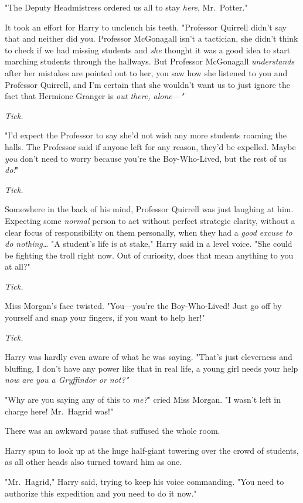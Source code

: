 "The Deputy Headmistress ordered us all to stay \emph{here}, Mr.~Potter."

It took an effort for Harry to unclench his teeth. "Professor Quirrell didn't 
say that and neither did you. Professor McGonagall isn't a tactician, she 
didn't think to check if we had missing students and \emph{she} thought it was 
a good idea to start marching students through the hallways. But Professor 
McGonagall \emph{understands} after her mistakes are pointed out to her, you 
saw how she listened to you and Professor Quirrell, and I'm certain that she 
wouldn't want us to just ignore the fact that Hermione Granger is \emph{out 
there, alone---"}

\emph{Tick.}

"I'd expect the Professor to say she'd not wish any more students roaming the 
halls. The Professor said if anyone left for any reason, they'd be expelled. 
Maybe \emph{you} don't need to worry because you're the Boy-Who-Lived, but the 
rest of us \emph{do!}"

\emph{Tick.}

Somewhere in the back of his mind, Professor Quirrell was just laughing at him. 
Expecting some \emph{normal} person to act without perfect strategic clarity, 
without a clear focus of responsibility on them personally, when they had a 
\emph{good excuse to do nothing{\ldots}} "A student's life is at stake," Harry 
said in a level voice. "She could be fighting the troll right now. Out of 
curiosity, does that mean anything to you at all?"

\emph{Tick.}

Miss Morgan's face twisted. "You---you're the Boy-Who-Lived! Just go off by 
yourself and snap your fingers, if you want to help her!"

\emph{Tick.}

Harry was hardly even aware of what he was saying. "That's just cleverness and 
bluffing, I don't have any power like that in real life, a young girl needs 
your help \emph{now are you a Gryffindor or not?"}

"Why are you saying any of this to \emph{me?}" cried Miss Morgan. "I wasn't 
left in charge here! Mr.~Hagrid was!"

There was an awkward pause that suffused the whole room.

Harry spun to look up at the huge half-giant towering over the crowd of 
students, as all other heads also turned toward him as one.

"Mr.~Hagrid," Harry said, trying to keep his voice commanding. "You need to 
authorize this expedition and you need to do it now."

